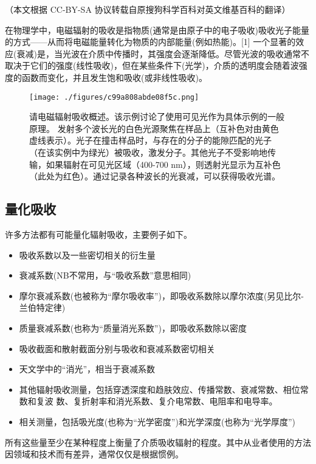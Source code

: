 
（本文根据 CC-BY-SA 协议转载自原搜狗科学百科对英文维基百科的翻译）

在物理学中，电磁辐射的吸收是指物质(通常是由原子中的电子吸收)吸收光子能量的方式——从而将电磁能量转化为物质的内部能量(例如热能)。[1] 一个显著的效应(衰减)是，当光波在介质中传播时，其强度会逐渐降低。尽管光波的吸收通常不取决于它们的强度(线性吸收)，但在某些条件下(光学)，介质的透明度会随着波强度的函数而变化，并且发生饱和吸收(或非线性吸收)。

\begin{figure}[ht]
\centering
\texttt{[image: ./figures/c99a808abde08f5c.png]}
\caption{请电磁辐射吸收概述。该示例讨论了使用可见光作为具体示例的一般原理。 发射多个波长光的白色光源聚焦在样品上（互补色对由黄色虚线表示）。光子在撞击样品时，与存在的分子的能隙匹配的光子（在该实例中为绿光）被吸收，激发分子。其他光子不受影响地传输，如果辐射在可见光区域（400-700 nm），则透射光显示为互补色（此处为红色）。通过记录各种波长的光衰减，可以获得吸收光谱。} \label{fig_XSGX_1}
\end{figure}

\subsection{量化吸收}

许多方法都有可能量化辐射吸收，主要例子如下。

\begin{itemize}
\item 吸收系数以及一些密切相关的衍生量
\item 衰减系数(NB不常用，与“吸收系数”意思相同)
\item 摩尔衰减系数(也被称为“摩尔吸收率”)，即吸收系数除以摩尔浓度(另见比尔-兰伯特定律)
\item 质量衰减系数(也称为“质量消光系数”)，即吸收系数除以密度
\item 吸收截面和散射截面分别与吸收和衰减系数密切相关
\item 天文学中的“消光”，相当于衰减系数
\item 其他辐射吸收测量，包括穿透深度和趋肤效应、传播常数、衰减常数、相位常数和复波 数、复折射率和消光系数、复介电常数、电阻率和电导率。
\item 相关测量，包括吸光度(也称为“光学密度”)和光学深度(也称为“光学厚度”)
\end{itemize}

所有这些量至少在某种程度上衡量了介质吸收辐射的程度。其中从业者使用的方法因领域和技术而有差异，通常仅仅是根据惯例。

